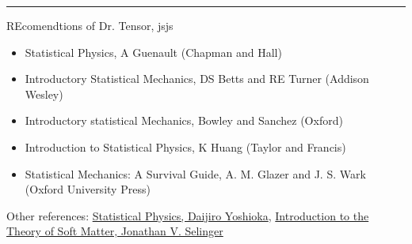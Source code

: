 \documentclass[a4paper, 11pt, oneside]{researchjournal} %
\begin{document}
\rule{\textwidth}{0.4pt}

REcomendtions of Dr. Tensor, jsjs

\begin{itemize}
	\item Statistical Physics, A Guenault (Chapman and Hall)
	\item Introductory Statistical Mechanics, DS Betts and RE Turner (Addison Wesley)
	\item Introductory statistical Mechanics, Bowley and Sanchez (Oxford)
	\item Introduction to Statistical Physics, K Huang (Taylor and Francis)
	\item Statistical Mechanics: A Survival Guide, A. M. Glazer and J. S. Wark (Oxford University Press)
\end{itemize}

Other references: 
\href{https://link.springer.com/book/10.1007/978-3-540-28606-6}{Statistical Physics, Daijiro Yoshioka}, 
\href{https://link.springer.com/book/10.1007/978-3-319-21054-4}{Introduction to the Theory of Soft Matter, Jonathan V. Selinger}

\end{document}
